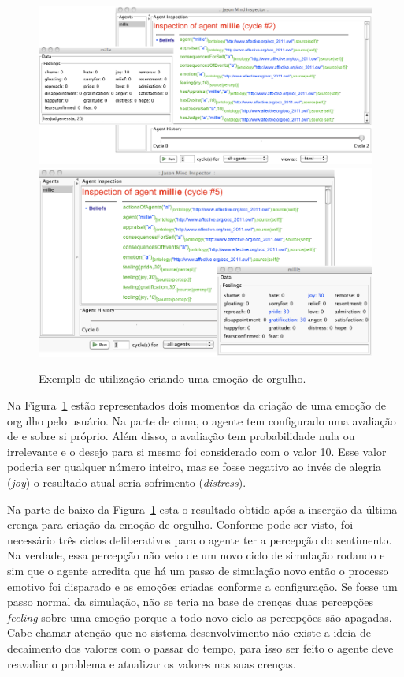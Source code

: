 \begin{figure}
	\begin{center}
		\includegraphics[width=150mm]{figuras/beforeLastInsertionOfPride.png}
		\includegraphics[width=150mm]{figuras/afterLastInsertionOfPride.png}
	\end{center}
	\caption{Exemplo de utilização criando uma emoção de orgulho.}
	\label{fig:testeJasonIntBase}
\end{figure}

Na Figura~\ref{fig:testeJasonIntBase} estão representados dois momentos da
criação de uma emoção de orgulho pelo usuário. Na parte de cima, o
agente tem configurado uma avaliação de e sobre si próprio. Além disso, a
avaliação tem probabilidade nula ou irrelevante e o desejo para si mesmo foi
considerado com o valor 10. Esse valor poderia ser qualquer número inteiro,
mas se fosse negativo ao invés de alegria (\emph{joy}) o resultado atual seria
sofrimento (\emph{distress}).

Na parte de baixo da Figura~\ref{fig:testeJasonIntBase} esta o resultado
obtido após a inserção da última crença para criação da emoção de orgulho.
Conforme pode ser visto,
foi necessário três ciclos deliberativos para o agente ter a percepção do
sentimento. Na verdade, essa percepção não veio de um novo ciclo de simulação
rodando e sim que o agente acredita que há um passo de simulação novo
então o processo emotivo foi disparado e as emoções criadas conforme
a configuração. Se fosse um passo normal da simulação, não se
teria na base de crenças duas percepções \emph{feeling} sobre uma emoção
porque a todo novo ciclo as percepções são apagadas. Cabe chamar atenção que
no sistema desenvolvimento não existe a ideia de decaimento dos valores com o
passar do tempo, para isso ser feito o agente deve reavaliar o problema e
atualizar os valores nas suas crenças.


